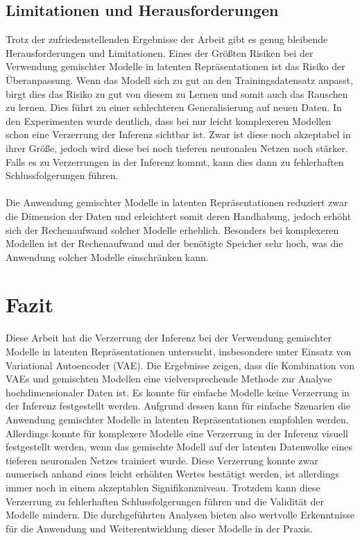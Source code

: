 \documentclass[%
thesis=student,%
coverpage=false,%
titlepage=false,%
headmarks=true, %
german,%
font=libertine, %
math=newpxtx, %
BCOR=5mm,%
coverBCOR=11mm%
]{tumbook}
\theoremstyle{break}
\begin{document}
\section{Limitationen und Herausforderungen}
Trotz der zufriedenstellenden Ergebnisse der Arbeit gibt es genug bleibende Herausforderungen und Limitationen. Eines der Größten Risiken bei der Verwendung gemischter Modelle in latenten Repräsentationen ist das Risiko der Überanpassung. Wenn das Modell sich zu gut an den Trainingsdatensatz anpasst, birgt dies das Risiko zu gut von diesem zu Lernen und somit auch das Rauschen zu lernen. Dies führt zu einer schlechteren Generalisierung auf neuen Daten. In den Experimenten wurde deutlich, dass bei nur leicht komplexeren Modellen schon eine Verzerrung der Inferenz sichtbar ist. Zwar ist diese noch akzeptabel in ihrer Größe, jedoch wird diese bei noch tieferen neuronalen Netzen noch stärker. Falls es zu Verzerrungen in der Inferenz kommt, kann dies dann zu fehlerhaften Schlussfolgerungen führen. \\
\\
Die Anwendung gemischter Modelle in latenten Repräsentationen reduziert zwar die Dimension der Daten und erleichtert somit deren Handhabung, jedoch erhöht sich der Rechenaufwand solcher Modelle erheblich. Besonders bei komplexeren Modellen ist der Rechenaufwand und der benötigte Speicher sehr hoch, was die Anwendung solcher Modelle einschränken kann. 

\chapter{Fazit}
Diese Arbeit hat die Verzerrung der Inferenz bei der Verwendung gemischter Modelle in latenten Repräsentationen untersucht, insbesondere unter Einsatz von Variational Autoencoder (VAE). Die Ergebnisse zeigen, dass die Kombination von VAEs und gemischten Modellen eine vielversprechende Methode zur Analyse hochdimensionaler Daten ist. Es konnte für einfache Modelle keine Verzerrung in der Inferenz festgestellt werden. Aufgrund dessen kann für einfache Szenarien die Anwendung gemischter Modelle in latenten Repräsentationen empfohlen werden. Allerdings konnte für komplexere Modelle eine Verzerrung in der Inferenz visuell festgestellt werden, wenn das gemischte Modell auf der latenten Datenwolke eines tieferen neuronalen Netzes trainiert wurde. Diese Verzerrung konnte zwar numerisch anhand eines leicht erhöhten Wertes bestätigt werden, ist allerdings immer noch in einem akzeptablen Signifikanzniveau. Trotzdem kann diese Verzerrung zu fehlerhaften Schlussfolgerungen führen und die Validität der Modelle mindern. Die durchgeführten Analysen bieten also wertvolle Erkenntnisse für die Anwendung und Weiterentwicklung dieser Modelle in der Praxis.
\end{document}
